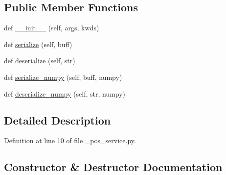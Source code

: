 \subsection*{Public Member Functions}
\begin{DoxyCompactItemize}
\item 
def \hyperlink{classpos__server_1_1srv_1_1__pos__service_1_1pos__serviceRequest_a3a5fa77dbfcddac8a3d610d44f2e17f5}{\+\_\+\+\_\+init\+\_\+\+\_\+} (self, args, kwds)
\item 
def \hyperlink{classpos__server_1_1srv_1_1__pos__service_1_1pos__serviceRequest_a94fcc622dd338edf578ee25bf7d08b6c}{serialize} (self, buff)
\item 
def \hyperlink{classpos__server_1_1srv_1_1__pos__service_1_1pos__serviceRequest_ac92c71439be77efb0e87776f14611402}{deserialize} (self, str)
\item 
def \hyperlink{classpos__server_1_1srv_1_1__pos__service_1_1pos__serviceRequest_a46787848dd765d90369c3086e78d47ed}{serialize\+\_\+numpy} (self, buff, numpy)
\item 
def \hyperlink{classpos__server_1_1srv_1_1__pos__service_1_1pos__serviceRequest_ad588ea48fd0cfd110600d268afb3cf24}{deserialize\+\_\+numpy} (self, str, numpy)
\end{DoxyCompactItemize}


\subsection{Detailed Description}


Definition at line 10 of file \+\_\+pos\+\_\+service.\+py.



\subsection{Constructor \& Destructor Documentation}
\mbox{\label{classpos__server_1_1srv_1_1__pos__service_1_1pos__serviceRequest_a3a5fa77dbfcddac8a3d610d44f2e17f5}} 
